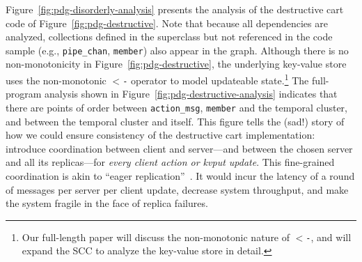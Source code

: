 

Figure~\ref{fig:pdg-disorderly-analysis} presents the analysis of the 
destructive cart code of Figure~\ref{fig:pdg-destructive}.  Note that
because all dependencies are analyzed, collections defined in the superclass
but not referenced in the code sample
(e.g., \texttt{pipe\_chan}, \texttt{member}) also appear in the graph.
Although there is no
non-monotonicity in 
Figure~\ref{fig:pdg-destructive}, the underlying key-value store
uses the non-monotonic \texttt{$<$-} operator to model updateable
state.\footnote{Our full-length paper will discuss the non-monotonic nature of \texttt{$<$-}, and
will expand the SCC to analyze the key-value store in detail.}
The full-program analysis shown in Figure~\ref{fig:pdg-destructive-analysis}
indicates that there are
points of order between \texttt{action\_msg}, \texttt{member} and the temporal cluster,
and between the temporal cluster and itself.
This figure tells the (sad!) story of how we could ensure consistency of the destructive cart implementation: introduce coordination
between client and server---and between the chosen server and all its replicas---for {\em every client action or kvput update}.  This fine-grained coordination is akin to ``eager replication''~\cite{dangers}. It would incur the latency of a round of messages per server per client update, decrease system throughput, and make the system fragile in the face of replica failures.

